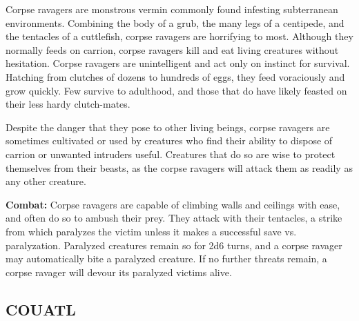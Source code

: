 \begin{multicols}{2}
\begin{minipage}{\columnwidth}
\end{minipage}

Corpse ravagers are monstrous vermin commonly found infesting subterranean environments. Combining the body of a grub, the many legs of a centipede, and the tentacles of a cuttlefish, corpse ravagers are horrifying to most. Although they normally feeds on carrion, corpse ravagers kill and eat living creatures without hesitation. Corpse ravagers are unintelligent and act only on instinct for survival. Hatching from clutches of dozens to hundreds of eggs, they feed voraciously and grow quickly. Few survive to adulthood, and those that do have likely feasted on their less hardy clutch-mates.

Despite the danger that they pose to other living beings, corpse ravagers are sometimes cultivated or used by creatures who find their ability to dispose of carrion or unwanted intruders useful. Creatures that do so are wise to protect themselves from their beasts, as the corpse ravagers will attack them as readily as any other creature.

\textbf{Combat:} Corpse ravagers are capable of climbing walls and ceilings with ease, and often do so to ambush their prey. They attack with their tentacles, a strike from which paralyzes the victim unless it makes a successful save vs. paralyzation. Paralyzed creatures remain so for 2d6 turns, and a corpse ravager may automatically bite a paralyzed creature. If no further threats remain, a corpse ravager will devour its paralyzed victims alive.

\noindent \begin{minipage}{\columnwidth}

\vspace{1em}

\subsection{COUATL}


\end{minipage}
\end{multicols}
